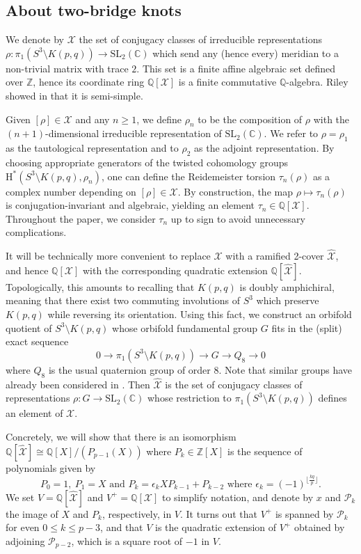 \documentclass{amsart}
\newcommand{\Q}{\mathbb{Q}}
\newcommand{\Z}{\mathbb{Z}}
\newcommand{\C}{\mathbb{C}}
\newcommand{\SL}{\mathrm{SL}}
\newcommand{\calX}{\mathcal{X}}
\newcommand{\SU}{\mathrm{SU}}
\newcommand{\SO}{\mathrm{SO}}
\def\calP{\mathcal{P}}
\theoremstyle{definition}
\begin{document}
\subsection{About two-bridge knots}

We denote by $\calX$ the set of conjugacy classes of irreducible representations $\rho:\pi_1(S^3\setminus K(p,q))\to \SL_2(\C)$ which send any (hence every) meridian to a non-trivial matrix with trace $2$. This set is a finite affine algebraic set defined over $\Z$, hence its coordinate ring $\Q[\calX]$ is a finite commutative $\Q$-algebra. Riley showed in \cite{Riley} that it is semi-simple. 

Given $[\rho]\in \calX$ and any $n\ge 1$, we define $\rho_n$ to be the composition of $\rho$ with the $(n+1)$-dimensional irreducible representation of $\SL_2(\C)$. We refer to $\rho=\rho_1$ as the tautological representation and to $\rho_2$ as the adjoint representation. 
By choosing appropriate generators of the twisted cohomology groups $\mathrm{H}^*(S^3\setminus K(p,q),\rho_n)$, one can define the Reidemeister torsion $\tau_n(\rho)$ as a complex number depending on $[\rho] \in \calX$. By construction, the map $\rho\mapsto \tau_n(\rho)$ is conjugation-invariant and algebraic, yielding an element $\tau_n \in \Q[\calX]$. Throughout the paper, we consider $\tau_n$ up to sign to avoid unnecessary complications. 

It will be technically more convenient to replace $\calX$ with a ramified 2-cover $\hat{\calX}$, and hence $\Q[\calX]$ with the corresponding quadratic extension $\Q[\hat{\calX}]$. Topologically, this amounts to recalling that $K(p,q)$ is doubly amphichiral, meaning that there exist two commuting involutions of $S^3$ which preserve $K(p,q)$ while reversing its orientation. Using this fact, we construct an orbifold quotient of $S^3\setminus K(p,q)$ whose orbifold fundamental group $G$ fits in the (split) exact sequence 
$$0\to \pi_1(S^3\setminus K(p,q))\to G\to Q_8\to 0$$
where $Q_8$ is the usual quaternion group of order $8$. Note that similar groups have already been considered in \cite{LS}. Then $\hat{\calX}$ is the set of conjugacy classes of representations $\rho:G\to \SL_2(\C)$ whose restriction to $\pi_1(S^3\setminus K(p,q))$ defines an element of $\calX$. 

Concretely, we will show that there is an isomorphism $\Q[\hat{\calX}] \cong \Q[X]/(P_{p-1}(X))$ where $P_k \in \Z[X]$ is the sequence of polynomials given by 
$$P_0=1,\ P_1=X\text{ and }P_{k}=\epsilon_k XP_{k-1}+P_{k-2}\text{ where }\epsilon_k=(-1)^{\lfloor \frac{kq}{p}\rfloor}.$$
We set $V=\Q[\hat{\calX}]$ and $V^+=\Q[\calX]$ to simplify notation, and denote by $x$ and $\calP_k$ the image of $X$ and $P_k$, respectively, in $V$. It turns out that $V^+$ is spanned by $\calP_k$ for even $0 \leq k \leq p-3$, and that $V$ is the quadratic extension of $V^+$ obtained by adjoining $\calP_{p-2}$, which is a square root of $-1$ in $V$.
\end{document}
